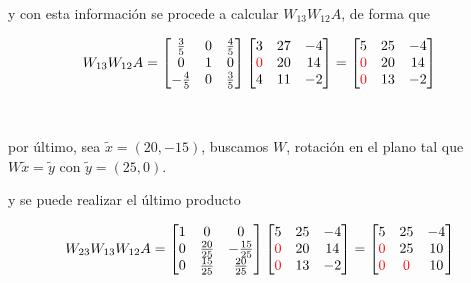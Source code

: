 y con esta información se procede a calcular $W_{13}W_{12}A$, de forma que

\[
W_{13}W_{12}A = 
\begin{bmatrix}
    \frac{3}{5} & 0 & \frac{4}{5} \\
    0 & 1 & 0 \\
    -\frac{4}{5} & 0 & \frac{3}{5}
\end{bmatrix}
\begin{bmatrix}
    3 & 27 & -4 \\
    \textcolor{red}{0} & 20 & 14 \\
    4 & 11 & -2
\end{bmatrix}
=
\begin{bmatrix}
    5 & 25 & -4 \\
    \textcolor{red}{0} & 20 & 14 \\
    \textcolor{red}{0} & 13 & -2
\end{bmatrix}
\]

\

por último, sea $\tilde{x} = (20,-15)$, buscamos $W$, rotación en el plano tal que $W\tilde{x} = \tilde{y}$ con $\tilde{y} = (25,0)$.

\begin{center}    
\end{center}

y se puede realizar el último producto

\[
W_{23}W_{13}W_{12}A = 
\begin{bmatrix}
    1 & 0 & 0 \\
    0 & \frac{20}{25} & -\frac{15}{25} \\
    0 & \frac{15}{25} & \frac{20}{25}
\end{bmatrix}
\begin{bmatrix}
    5 & 25 & -4 \\
    \textcolor{red}{0} & 20 & 14 \\
    \textcolor{red}{0} & 13 & -2
\end{bmatrix}
=
\begin{bmatrix}
    5 & 25 & -4 \\
    \textcolor{red}{0} & 25 & 10 \\
    \textcolor{red}{0} & \textcolor{red}{0} & 10
\end{bmatrix}
\]

